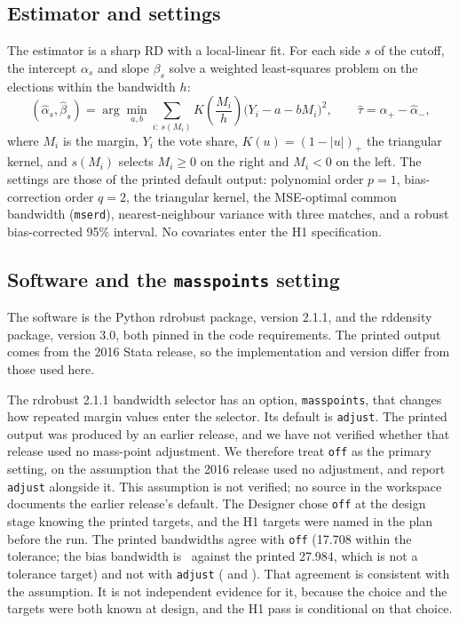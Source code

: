 \documentclass[11pt]{article}
\newcommand{\ppd}[2]{\pgfmathparse{#2}\pgfmathprintnumber[fixed,precision=#1]{\pgfmathresult}}
\begin{document}
\subsection{Estimator and settings}

The estimator is a sharp RD with a local-linear fit. For each side $s$ of the cutoff, the intercept $\alpha_s$ and slope $\beta_s$ solve a weighted least-squares problem on the elections within the bandwidth $h$:
\begin{equation}
(\hat\alpha_s,\hat\beta_s)=\arg\min_{a,b}\sum_{i:\,s(M_i)}K\!\left(\frac{M_i}{h}\right)\bigl(Y_i-a-bM_i\bigr)^2,
\qquad
\hat\tau=\hat\alpha_{+}-\hat\alpha_{-},
\end{equation}
where $M_i$ is the margin, $Y_i$ the vote share, $K(u)=(1-|u|)_+$ the triangular kernel, and $s(M_i)$ selects $M_i\ge 0$ on the right and $M_i<0$ on the left. The settings are those of the printed default output: polynomial order $p=1$, bias-correction order $q=2$, the triangular kernel, the MSE-optimal common bandwidth (\texttt{mserd}), nearest-neighbour variance with three matches, and a robust bias-corrected 95\% interval. No covariates enter the H1 specification.

\subsection{Software and the \texttt{masspoints} setting}

The software is the Python rdrobust package, version 2.1.1, and the rddensity package, version 3.0, both pinned in the code requirements. The printed output comes from the 2016 Stata release, so the implementation and version differ from those used here.

The rdrobust 2.1.1 bandwidth selector has an option, \texttt{masspoints}, that changes how repeated margin values enter the selector. Its default is \texttt{adjust}. The printed output was produced by an earlier release, and we have not verified whether that release used no mass-point adjustment. We therefore treat \texttt{off} as the primary setting, on the assumption that the 2016 release used no adjustment, and report \texttt{adjust} alongside it. This assumption is not verified; no source in the workspace documents the earlier release's default. The Designer chose \texttt{off} at the design stage knowing the printed targets, and the H1 targets were named in the plan before the run. The printed bandwidths agree with \texttt{off} (17.708 within the tolerance; the bias bandwidth is \RdBOff\ against the printed 27.984, which is not a tolerance target) and not with \texttt{adjust} (\ppd{3}{\RdAdjBw} and \ppd{3}{\RdBAdj}). That agreement is consistent with the assumption. It is not independent evidence for it, because the choice and the targets were both known at design, and the H1 pass is conditional on that choice.
\end{document}
